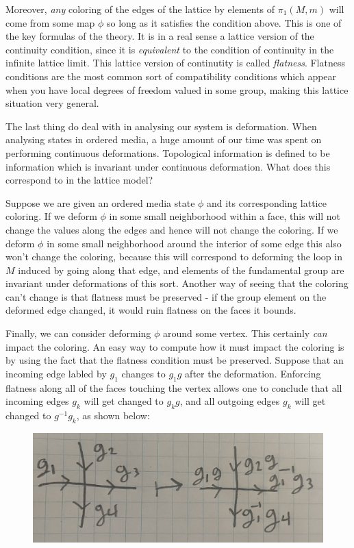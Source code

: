 \documentclass{article}
\theoremstyle{definition}
\newcommand{\0}{\left|0\right>}
\newcommand{\1}{\left|1\right>}
\numberwithin{figure}{section}
\begin{document}
Moreover, \textit{any} coloring of the edges of the lattice by elements of $\pi_1(M,m)$ will come from some map $\phi$ so long as it satisfies the condition above. This is one of the key formulas of the theory. It is in a real sense a lattice version of the continuity condition, since it is \textit{equivalent} to the condition of continuity in the infinite lattice limit. This lattice version of continutity is called \textit{flatness}. Flatness conditions are the most common sort of compatibility conditions which appear when you have local degrees of freedom valued in some group, making this lattice situation very general.

The last thing do deal with in analysing our system is deformation. When analysing states in ordered media, a huge amount of our time was spent on performing continuous deformations. Topological information is defined to be information which is invariant under continuous deformation. What does this correspond to in the lattice model?

Suppose we are given an ordered media state $\phi$ and its corresponding lattice coloring. If we deform $\phi$ in some small neighborhood within a face, this will not change the values along the edges and hence will not change the coloring. If we deform $\phi$ in some small neighborhood around the interior of some edge this also won't change the coloring, because this will correspond to deforming the loop in $M$ induced by going along that edge, and elements of the fundamental group are invariant under deformations of this sort. Another way of seeing that the coloring can't change is that flatness must be preserved - if the group element on the deformed edge changed, it would ruin flatness on the faces it bounds.

Finally, we can consider deforming $\phi$ around some vertex. This certainly \textit{can} impact the coloring. An easy way to compute how it must impact the coloring is by using the fact that the flatness condition must be preserved. Suppose that an incoming edge labled by $g_1$ changes to $g_1 g$ after the deformation. Enforcing flatness along all of the faces touching the vertex allows one to conclude that all incoming edges $g_k$ will get changed to $g_k g$, and all outgoing edges $g_k$ will get changed to $g^{-1}g_k$, as shown below:

\begin{figure}[h]
\begin{center}
\includegraphics[scale=.04]{gauge-transformation}
\end{center}
\end{figure}
\end{document}
